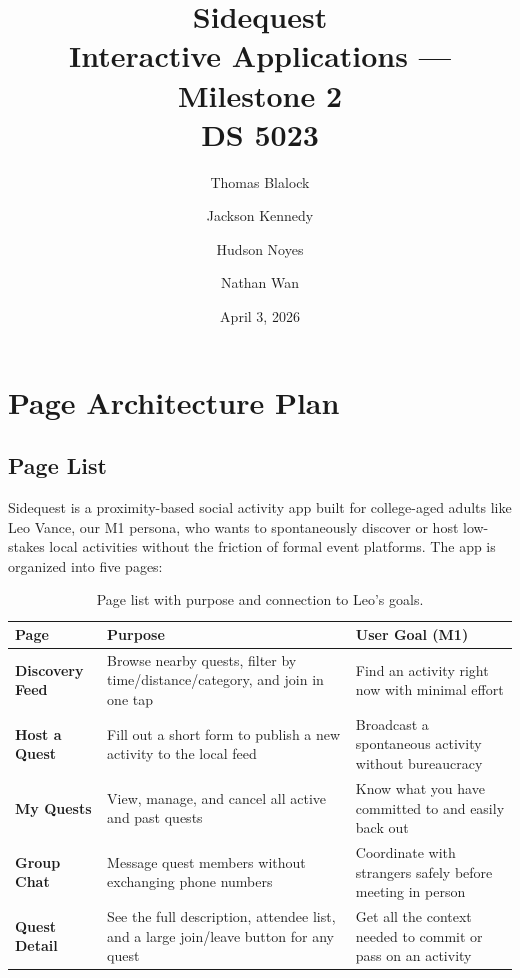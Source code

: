 \documentclass[11pt]{article}
\title{\textbf{Sidequest} \\ \large Interactive Applications --- Milestone 2 \\ \normalsize DS 5023}
\author{Thomas Blalock \and Jackson Kennedy \and Hudson Noyes \and Nathan Wan}
\date{April 3, 2026}
\begin{document}
\maketitle

\tableofcontents
\newpage

\section{Page Architecture Plan}

\subsection{Page List}

Sidequest is a proximity-based social activity app built for college-aged adults like Leo Vance, our M1 persona, who wants to spontaneously discover or host low-stakes local activities without the friction of formal event platforms. The app is organized into five pages:

\begin{table}[h!]
\centering
\begin{tabularx}{\textwidth}{>{\bfseries}l X l}
\toprule
Page & Purpose & User Goal (M1) \\
\midrule
Discovery Feed & Browse nearby quests, filter by time/distance/category, and join in one tap & Find an activity right now with minimal effort \\
\addlinespace
Host a Quest & Fill out a short form to publish a new activity to the local feed & Broadcast a spontaneous activity without bureaucracy \\
\addlinespace
My Quests & View, manage, and cancel all active and past quests & Know what you have committed to and easily back out \\
\addlinespace
Group Chat & Message quest members without exchanging phone numbers & Coordinate with strangers safely before meeting in person \\
\addlinespace
Quest Detail & See the full description, attendee list, and a large join/leave button for any quest & Get all the context needed to commit or pass on an activity \\
\bottomrule
\end{tabularx}
\caption{Page list with purpose and connection to Leo's goals.}
\end{table}
\end{document}
